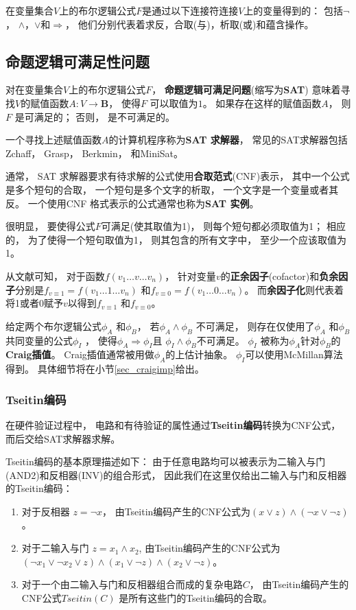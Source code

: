 在变量集合$V$上的布尔逻辑公式$F$是通过以下连接符连接$V$上的变量得到的：
包括$\neg$， $\wedge$，$\vee$和$\Rightarrow$，
他们分别代表着求反，合取(与)，析取(或)和蕴含操作。

\subsection{命题逻辑可满足性问题}

对在变量集合$V$上的布尔逻辑公式$F$，
\textbf{命题逻辑可满足问题}(缩写为\textbf{SAT})
意味着寻找$V$的赋值函数$A:V\to \mathbf{B}$，
使得$F$ 可以取值为$1$。
如果存在这样的赋值函数$A$，
则$F$ 是可满足的；
否则，
是不可满足的。

一个寻找上述赋值函数$A$的计算机程序称为\textbf{SAT 求解器}，
常见的SAT求解器包括Zchaff，
Grasp，
Berkmin，
和MiniSat。


通常，
SAT 求解器要求有待求解的公式使用\textbf{合取范式}(CNF)表示，
其中一个公式是多个短句的合取，
一个短句是多个文字的析取，
一个文字是一个变量或者其反。
一个使用CNF 格式表示的公式通常也称为\textbf{SAT 实例}。

很明显，
要使得公式$F$可满足(使其取值为1)，
则每个短句都必须取值为1；
相应的，
为了使得一个短句取值为1，
则其包含的所有文字中，
至少一个应该取值为1。

从文献可知，
对于函数$f(v_1\dots v\dots v_n)$，
针对变量$v$的\textbf{正余因子}(cofactor)和\textbf{负余因子}分别是$f_{v\equiv 1}=f(v_1\dots 1\dots v_n)$ 和$f_{v\equiv 0}=f(v_1\dots 0\dots v_n)$。
而\textbf{余因子化}则代表着将1或者0赋予$v$以得到$f_{v\equiv 1}$ 和$f_{v\equiv 0}$。

给定两个布尔逻辑公式$\phi_A$ 和$\phi_B$，
若$\phi_A\wedge \phi_B$ 不可满足，
则存在仅使用了$\phi_A$ 和$\phi_B$共同变量的公式$\phi_I$ ，
 使得$\phi_A\Rightarrow \phi_I$且
$\phi_I\wedge \phi_B$不可满足。
$\phi_I$ 被称为$\phi_A$针对$\phi_B$的\textbf{Craig插值}。
Craig插值通常被用做$\phi_A$的上估计抽象。
$\phi_I$可以使用McMillan算法得到。
具体细节将在小节\ref{sec_craigimp}给出。

\subsubsection{Tseitin编码}\label{subsubsec_tseitin}
在硬件验证过程中，
电路和有待验证的属性通过\textbf{Tseitin编码}转换为CNF公式，
而后交给SAT求解器求解。

Tseitin编码的基本原理描述如下：
由于任意电路均可以被表示为二输入与门(AND2)和反相器(INV)的组合形式，
因此我们在这里仅给出二输入与门和反相器的Tseitin编码：
\begin{enumerate}
\item 对于反相器 $z=\neg x$，
由Tseitin编码产生的CNF公式为$(x\vee z)\wedge( \neg x\vee \neg z)$。
\item 对于二输入与门 $z=x_1\wedge x_2$,
由Tseitin编码产生的CNF公式为$( \neg x_1\vee \neg x_2\vee z)\wedge(x_1\vee \neg z) \wedge(x_2\vee \neg z)$。
\item 对于一个由二输入与门和反相器组合而成的复杂电路$C$，
由Tseitin编码产生的CNF公式$Tseitin(C)$ 是所有这些门的Tseitin编码的合取。
\end{enumerate}

